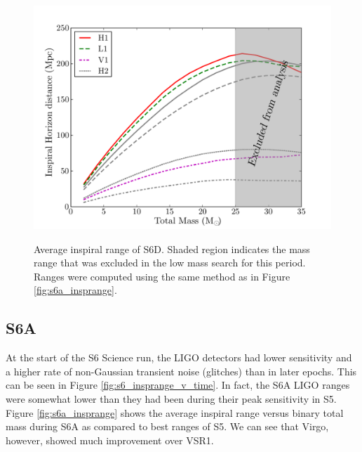 \begin{figure}[p]
\begin{center}
\label{fig:s6d_insprange}
\includegraphics[width=6in]{figures/s6d_insprange_alt.pdf}
\end{center}
\caption{Average inspiral range of S6D. Shaded region indicates the mass range that was excluded in the low mass search for this period. Ranges were computed using the same method as in Figure \ref{fig:s6a_insprange}.}
\end{figure}

\subsection{S6A}
\label{sec:s6a}

At the start of the S6 Science run, the \ac{LIGO} detectors had lower
sensitivity and a higher rate of non-Gaussian transient noise (glitches) than
in later epochs. This can be seen in Figure \ref{fig:s6_insprange_v_time}. In
fact, the S6A \ac{LIGO} ranges were somewhat lower than they had been during
their peak sensitivity in \ac{S5}. Figure \ref{fig:s6a_insprange} shows the
average inspiral range versus binary total mass during S6A as compared to best
ranges of \ac{S5}. We can see that Virgo, however, showed much improvement over
VSR1.

